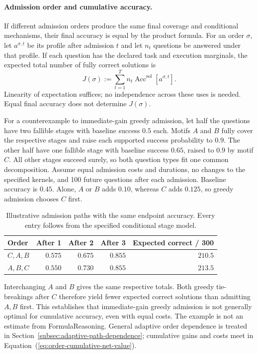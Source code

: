 \documentclass[10pt]{article} %
\renewcommand{\eqref}[1]{\textup{(\ref{#1})}}
\providecommand{\1}{\mathbf{1}}  %
\theoremstyle{remark}
\theoremstyle{definition}
\begin{document}
\paragraph{Admission order and cumulative accuracy.}
If different admission orders produce the same final coverage and
conditional mechanisms, their final accuracy is equal by the product
formula. For an order $\sigma$, let $a^{\sigma,t}$ be its profile after
admission $t$ and let $n_t$ questions be answered under that profile.
If each question has the declared task and execution marginals, the
expected total number of fully correct solutions is
\begin{equation}
J(\sigma):=\sum_{t=1}^{T}n_t
\operatorname{Acc}^{\mathrm{sol}}[a^{\sigma,t}].
\label{eq:reuse-order-cumulative-accuracy}
\end{equation}
Linearity of expectation suffices; no independence across these uses is
needed. Equal final accuracy does not determine $J(\sigma)$.

For a counterexample to immediate-gain greedy admission, let half the
questions have two fallible stages with baseline success $0.5$ each.
Motifs $A$ and $B$ fully cover the respective stages and raise each
supported success probability to $0.9$. The other half have one fallible
stage with baseline success $0.65$, raised to $0.9$ by motif $C$.
All other stages succeed surely, so both question types fit one common
decomposition. Assume equal admission costs and durations, no changes
to the specified kernels, and 100 future questions after each admission.
Baseline accuracy is $0.45$. Alone, $A$ or $B$ adds $0.10$, whereas
$C$ adds $0.125$, so greedy admission chooses $C$ first.
\begin{table}[htbp]
\centering
\small
\begin{tabular}{@{}lrrrr@{}}
\toprule
Order & After 1 & After 2 & After 3 & Expected correct / 300\\
\midrule
$C,A,B$ & $0.575$ & $0.675$ & $0.855$ & $210.5$\\
$A,B,C$ & $0.550$ & $0.730$ & $0.855$ & $213.5$\\
\bottomrule
\end{tabular}
\caption{Illustrative admission paths with the same endpoint accuracy.
Every entry follows from the specified conditional stage model.}
\label{tab:reuse-admission-order-example}
\end{table}
Interchanging $A$ and $B$ gives the same respective totals. Both greedy
tie-breakings after $C$ therefore yield fewer expected correct solutions
than admitting $A,B$ first. This establishes that immediate-gain greedy
admission is not generally optimal for cumulative accuracy, even with
equal costs. The example is not an estimate from FormulaReasoning.
General adaptive order dependence is treated in
Section~\ref{subsec:adaptive-path-dependence}; cumulative gains and costs
meet in Equation~\eqref{eq:order-cumulative-net-value}.
\end{document}
